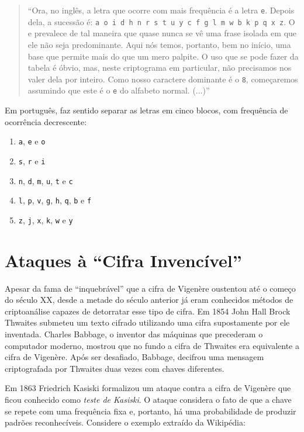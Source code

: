 \begin{quote}
``Ora, no inglês, a letra que ocorre com mais frequência é a letra {\tt e}. 
Depois dela, a sucessão é: {\tt a o i d h n r s t u y c f g l m w b k p q x z}. 
O e prevalece de tal maneira que quase nunca se vê uma frase isolada em que ele não seja predominante. 
Aqui nós temos, portanto, bem no início, uma base que permite mais do que um mero palpite. 
O uso que se pode fazer da tabela é óbvio, mas, neste criptograma em particular, não precisamos nos valer dela por inteiro. 
Como nosso caractere dominante é o {\tt 8}, começaremos assumindo que este é o {\tt e} do alfabeto normal. (...)''
\end{quote}

Em português, faz sentido separar as letras em cinco blocos, com frequência de ocorrência decrescente:
\begin{enumerate}
\item {\tt a}, {\tt e} e {\tt o}
\item {\tt s}, {\tt r} e {\tt i}
\item {\tt n}, {\tt d}, {\tt m}, {\tt u}, {\tt t} e {\tt c}
\item {\tt l}, {\tt p}, {\tt v}, {\tt g}, {\tt h}, {\tt q}, {\tt b} e {\tt f}
\item {\tt z}, {\tt j}, {\tt x}, {\tt k}, {\tt w} e {\tt y}
\end{enumerate}

\section{Ataques à ``Cifra Invencível''}
\label{sec:criptoanalise-vegenere}

Apesar da fama de ``inquebrável'' que a cifra de Vigenère oustentou até o começo do século XX, desde a metade do século anterior já eram conhecidos métodos de criptoanálise capazes de detorratar esse tipo de cifra.
Em 1854 John Hall Brock Thwaites submeteu um texto cifrado utilizando uma cifra supostamente por ele inventada.
Charles Babbage, o inventor das máquinas que precederam o computador moderno, mostrou que no fundo a cifra de Thwaites era equivalente a cifra de Vigenère.
Após ser desafiado, Babbage, decifrou uma mensagem criptografada por Thwaites duas vezes com chaves diferentes.

Em 1863 Friedrich Kasiski formalizou um ataque contra a cifra de Vigenère que ficou conhecido como {\em teste de Kasiski}.
O ataque considera o fato de que a chave se repete com uma frequência fixa e, portanto, há uma probabilidade de produzir padrões reconhecíveis.
Considere o exemplo extraído da Wikipédia:

